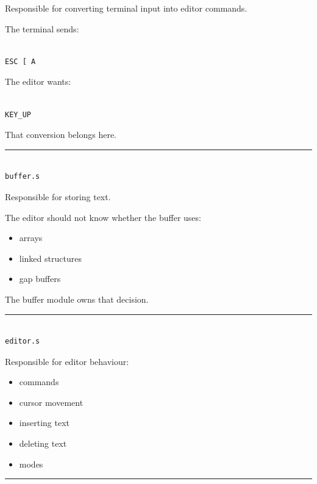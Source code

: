 \documentclass[
  oneside,
  openany]{book}
\providecommand{\tightlist}{%
  \setlength{\itemsep}{0pt}\setlength{\parskip}{0pt}}
\begin{document}
Responsible for converting terminal input into editor commands.

The terminal sends:

\begin{verbatim}

ESC [ A
\end{verbatim}

The editor wants:

\begin{verbatim}

KEY_UP
\end{verbatim}

That conversion belongs here.

\begin{center}\rule{0.5\linewidth}{0.5pt}\end{center}

\begin{verbatim}

buffer.s
\end{verbatim}

Responsible for storing text.

The editor should not know whether the buffer uses:

\begin{itemize}
\tightlist
\item
  arrays
\item
  linked structures
\item
  gap buffers
\end{itemize}

The buffer module owns that decision.

\begin{center}\rule{0.5\linewidth}{0.5pt}\end{center}

\begin{verbatim}

editor.s
\end{verbatim}

Responsible for editor behaviour:

\begin{itemize}
\tightlist
\item
  commands
\item
  cursor movement
\item
  inserting text
\item
  deleting text
\item
  modes
\end{itemize}

\begin{center}\rule{0.5\linewidth}{0.5pt}\end{center}
\end{document}
